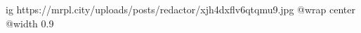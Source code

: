  
 
 
 
 

\ifcmt
  ig https://mrpl.city/uploads/posts/redactor/xjh4dxflv6qtqmu9.jpg
  @wrap center
  @width 0.9
\fi
